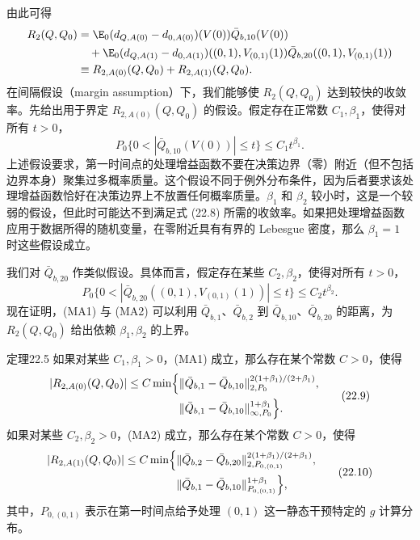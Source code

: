 由此可得
\[
\begin{aligned}
 R_2(Q,Q_0)
 &=\E_0(d_{Q,A(0)}-d_{0,A(0)})(V(0))\bar Q_{b,10}(V(0))\\
 &\quad+\E_0(d_{Q,A(1)}-d_{0,A(1)})((0,1),V_{(0,1)}(1))
 \bar Q_{b,20}((0,1),V_{(0,1)}(1))\\
 &\equiv R_{2,A(0)}(Q,Q_0)+R_{2,A(1)}(Q,Q_0).
\end{aligned}
\]
在间隔假设（margin assumption）下，我们能够使 $R_2(Q,Q_0)$ 达到较快的收敛率。先给出用于界定 $R_{2,A(0)}(Q,Q_0)$ 的假设。假定存在正常数 $C_1,\beta_1$，使得对所有 $t>0$，
\begin{equation}
 P_0\bigl\{0<|\bar Q_{b,10}(V(0))|\leq t\bigr\}\leq C_1t^{\beta_1}.
\tag{MA1}
\end{equation}
上述假设要求，第一时间点的处理增益函数不要在决策边界（零）附近（但不包括边界本身）聚集过多概率质量。这个假设不同于例外分布条件，因为后者要求该处理增益函数恰好在决策边界上不放置任何概率质量。$\beta_1$ 和 $\beta_2$ 较小时，这是一个较弱的假设，但此时可能达不到满足式 (22.8) 所需的收敛率。如果把处理增益函数应用于数据所得的随机变量，在零附近具有有界的 Lebesgue 密度，那么 $\beta_1=1$ 时这些假设成立。

我们对 $\bar Q_{b,20}$ 作类似假设。具体而言，假定存在某些 $C_2,\beta_2$，使得对所有 $t>0$，
\begin{equation}
 P_0\bigl\{0<|\bar Q_{b,20}((0,1),V_{(0,1)}(1))|\leq t\bigr\}
 \leq C_2t^{\beta_2}.
\tag{MA2}
\end{equation}
现在证明，(MA1) 与 (MA2) 可以利用 $\bar Q_{b,1}$、$\bar Q_{b,2}$ 到 $\bar Q_{b,10}$、$\bar Q_{b,20}$ 的距离，为 $R_2(Q,Q_0)$ 给出依赖 $\beta_1,\beta_2$ 的上界。

\begin{bookresult}{定理}{22.5}
如果对某些 $C_1,\beta_1>0$，(MA1) 成立，那么存在某个常数 $C>0$，使得
\begin{equation}
\begin{aligned}
 |R_{2,A(0)}(Q,Q_0)|\leq C\min\Bigl\{
 &\|\bar Q_{b,1}-\bar Q_{b,10}\|_{2,P_0}^{2(1+\beta_1)/(2+\beta_1)},\\
 &\|\bar Q_{b,1}-\bar Q_{b,10}\|_{\infty,P_0}^{1+\beta_1}\Bigr\}.
\end{aligned}
\tag{22.9}
\end{equation}
如果对某些 $C_2,\beta_2>0$，(MA2) 成立，那么存在某个常数 $C>0$，使得
\begin{equation}
\begin{aligned}
 |R_{2,A(1)}(Q,Q_0)|\leq C\min\Bigl\{
 &\|\bar Q_{b,2}-\bar Q_{b,20}\|_{2,P_{0,(0,1)}}^{2(1+\beta_1)/(2+\beta_1)},\\
 &\|\bar Q_{b,1}-\bar Q_{b,10}\|_{P_{0,(0,1)}}^{1+\beta_1}\Bigr\},
\end{aligned}
\tag{22.10}
\end{equation}
其中，$P_{0,(0,1)}$ 表示在第一时间点给予处理 $(0,1)$ 这一静态干预特定的 $g$ 计算分布。
\end{bookresult}

